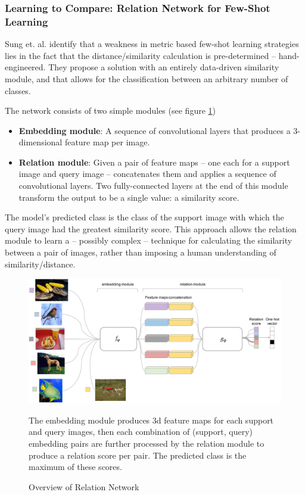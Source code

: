 \documentclass{report}
\begin{document}
	\subsubsection{Learning to Compare: Relation Network for Few-Shot Learning}
	Sung et. al. \parencite{relationnet} identify that a weakness in metric based few-shot learning strategies lies in the fact that the distance/similarity calculation is pre-determined -- hand-engineered. They propose a solution with an entirely data-driven similarity module, and that allows for the classification between an arbitrary number of classes. \par
	The network consists of two simple modules (see figure \ref{fig:relation-net:1})
	\begin{itemize}
		\item\textbf{Embedding module}: A sequence of convolutional layers that produces a 3-dimensional feature map per image.
		\item\textbf{Relation module}: Given a pair of feature maps -- one each for a support image and query image -- concatenates them and applies a sequence of convolutional layers. Two fully-connected layers at the end of this module transform the output to be a single value: a similarity score.
	\end{itemize}
	The model's predicted class is the class of the support image with which the query image had the greatest similarity score. This approach allows the relation module to learn a -- possibly complex -- technique for calculating the similarity between a pair of images, rather than imposing a human understanding of similarity/distance. \par
	\begin{figure}[h]
		\centering
		\includegraphics[width=14cm]{relationnet}
		\caption{Overview of Relation Network}
		The embedding module produces 3d feature maps for each support and query images, then each combination of (support, query) embedding pairs are further processed by the relation module to produce a relation score per pair. The predicted class is the maximum of these scores.
		\label{fig:relation-net:1}
	\end{figure}
\end{document}
